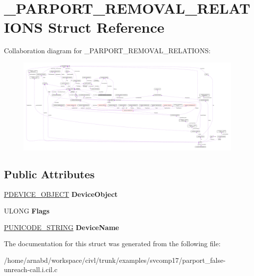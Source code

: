 \hypertarget{struct__PARPORT__REMOVAL__RELATIONS}{}\section{\+\_\+\+P\+A\+R\+P\+O\+R\+T\+\_\+\+R\+E\+M\+O\+V\+A\+L\+\_\+\+R\+E\+L\+A\+T\+I\+O\+N\+S Struct Reference}
\label{struct__PARPORT__REMOVAL__RELATIONS}


Collaboration diagram for \+\_\+\+P\+A\+R\+P\+O\+R\+T\+\_\+\+R\+E\+M\+O\+V\+A\+L\+\_\+\+R\+E\+L\+A\+T\+I\+O\+N\+S\+:
\nopagebreak
\begin{figure}[H]
\begin{center}
\leavevmode
\includegraphics[width=350pt]{struct__PARPORT__REMOVAL__RELATIONS__coll__graph}
\end{center}
\end{figure}
\subsection*{Public Attributes}
\begin{DoxyCompactItemize}
\item 
\hypertarget{struct__PARPORT__REMOVAL__RELATIONS_a64b9e283b44b19342165fa0e51dd4e32}{}\hyperlink{struct__DEVICE__OBJECT}{P\+D\+E\+V\+I\+C\+E\+\_\+\+O\+B\+J\+E\+C\+T} {\bfseries Device\+Object}\label{struct__PARPORT__REMOVAL__RELATIONS_a64b9e283b44b19342165fa0e51dd4e32}

\item 
\hypertarget{struct__PARPORT__REMOVAL__RELATIONS_ab00f27db8d8f8b70f243255dffffc325}{}U\+L\+O\+N\+G {\bfseries Flags}\label{struct__PARPORT__REMOVAL__RELATIONS_ab00f27db8d8f8b70f243255dffffc325}

\item 
\hypertarget{struct__PARPORT__REMOVAL__RELATIONS_a31ca42bc362f99e721d200da0c9ea96c}{}\hyperlink{struct__UNICODE__STRING}{P\+U\+N\+I\+C\+O\+D\+E\+\_\+\+S\+T\+R\+I\+N\+G} {\bfseries Device\+Name}\label{struct__PARPORT__REMOVAL__RELATIONS_a31ca42bc362f99e721d200da0c9ea96c}

\end{DoxyCompactItemize}


The documentation for this struct was generated from the following file\+:\begin{DoxyCompactItemize}
\item 
/home/arnabd/workspace/civl/trunk/examples/svcomp17/parport\+\_\+false-\/unreach-\/call.\+i.\+cil.\+c\end{DoxyCompactItemize}
